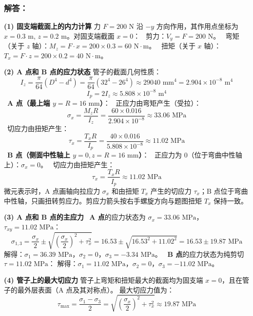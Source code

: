 \documentclass[11pt,a4paper]{ctexrep}
\begin{document}
{\subsubsection*{解答：}

\textbf{(1) 固支端截面上的内力计算}
力 $F = 200\text{ N}$ 沿 $-y$ 方向作用，其作用点坐标为 $x = 0.3\text{ m}$, $z = 0.2\text{ m}$。对固支端截面 $x=0$：
\noindent\textbullet\ 剪力：$V_y = F = 200\text{ N}$。
\noindent\textbullet\ 弯矩（关于 $z$ 轴）：$M_z = F \cdot x = 200 \times 0.3 = 60\text{ N}\cdot\text{m}$。
\noindent\textbullet\ 扭矩（关于 $x$ 轴）：$T_x = F \cdot z = 200 \times 0.2 = 40\text{ N}\cdot\text{m}$。

\textbf{(2) A 点和 B 点的应力状态}
管子的截面几何性质：
\[
I_z = \frac{\pi}{64} (D^4 - d^4) = \frac{\pi}{64} (32^4 - 26^4) \approx 29040\text{ mm}^4 = 2.904 \times 10^{-8}\text{ m}^4
\]
\[
I_p = 2 I_z \approx 5.808 \times 10^{-8}\text{ m}^4
\]
\noindent\textbullet\ \textbf{A 点（最上端 $y = R = 16\text{ mm}$）}：
\noindent\textbullet\ 正应力由弯矩产生（受拉）：
    \[
    \sigma_x = \frac{M_z R}{I_z} = \frac{60 \times 0.016}{2.904 \times 10^{-8}} \approx 33.06\text{ MPa}
    \]
\noindent\textbullet\ 切应力由扭矩产生：
    \[
    \tau_x = \frac{T_x R}{I_p} = \frac{40 \times 0.016}{5.808 \times 10^{-8}} \approx 11.02\text{ MPa}
    \]
\noindent\textbullet\ \textbf{B 点（侧面中性轴上 $y = 0, z = R = 16\text{ mm}$）}：
\noindent\textbullet\ 正应力为 0（位于弯曲中性轴上）：$\sigma_x = 0$。
\noindent\textbullet\ 切应力由扭矩产生：
    \[
    \tau_x = \frac{T_x R}{I_p} \approx 11.02\text{ MPa}
    \]
微元表示时，A 点画轴向拉应力 $\sigma_x$ 和由扭矩 $T_x$ 产生的切应力 $\tau_x$；B 点位于弯曲中性轴，只画扭转剪应力。剪应力箭头按右手螺旋方向与题图扭矩 $T_x$ 保持一致。

\textbf{(3) A 点和 B 点的主应力}
\noindent\textbullet\ \textbf{A 点}的应力状态为 $\sigma_x = 33.06\text{ MPa}$，$\tau_{xy} = 11.02\text{ MPa}$：
  \[
  \sigma_{1,3} = \frac{\sigma_x}{2} \pm \sqrt{\left(\frac{\sigma_x}{2}\right)^2 + \tau_x^2} = 16.53 \pm \sqrt{16.53^2 + 11.02^2} = 16.53 \pm 19.87\text{ MPa}
  \]
  解得：$\sigma_1 = 36.39\text{ MPa}$，$\sigma_2 = 0$，$\sigma_3 = -3.34\text{ MPa}$。
\noindent\textbullet\ \textbf{B 点}的应力状态为纯剪切 $\tau = 11.02\text{ MPa}$：
  解得：$\sigma_1 = 11.02\text{ MPa}$，$\sigma_2 = 0$，$\sigma_3 = -11.02\text{ MPa}$。

\textbf{(4) 管子上的最大切应力}
管子上弯矩和扭矩最大的截面均为固支端 $x=0$，且在管子的最外层表面（A 点及其对称点）。
最大切应力值为：
\[
\tau_{\max} = \frac{\sigma_1 - \sigma_3}{2} = \sqrt{\left(\frac{\sigma_x}{2}\right)^2 + \tau_x^2} \approx 19.87\text{ MPa}
\]


}
\end{document}
